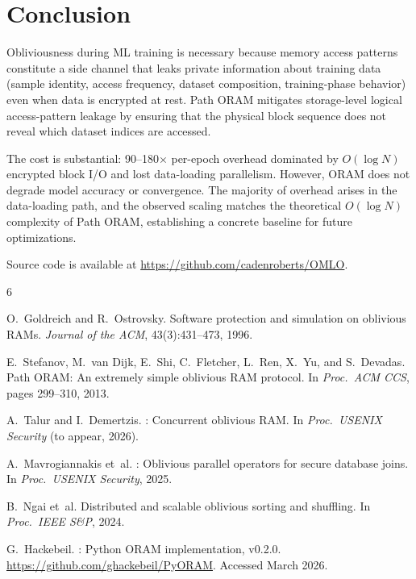 \documentclass[11pt]{article}
\begin{document}
\section{Conclusion}

Obliviousness during ML training is necessary because memory access patterns constitute a side channel that leaks private information about training data (sample identity, access frequency, dataset composition, training-phase behavior) even when data is encrypted at rest.
Path ORAM mitigates storage-level logical access-pattern leakage by ensuring that the physical block sequence does not reveal which dataset indices are accessed.

The cost is substantial: 90--180$\times$ per-epoch overhead dominated by $O(\log N)$ encrypted block I/O and lost data-loading parallelism.
However, ORAM does not degrade model accuracy or convergence.
The majority of overhead arises in the data-loading path, and the observed scaling matches the theoretical $O(\log N)$ complexity of Path ORAM, establishing a concrete baseline for future optimizations.

Source code is available at \url{https://github.com/cadenroberts/OMLO}.

\begin{thebibliography}{6}

O.~Goldreich and R.~Ostrovsky.
\newblock Software protection and simulation on oblivious {RAM}s.
\newblock \emph{Journal of the ACM}, 43(3):431--473, 1996.

E.~Stefanov, M.~van Dijk, E.~Shi, C.~Fletcher, L.~Ren, X.~Yu, and S.~Devadas.
\newblock Path {ORAM}: An extremely simple oblivious {RAM} protocol.
\newblock In \emph{Proc.\ ACM CCS}, pages 299--310, 2013.

A.~Talur and I.~Demertzis.
: Concurrent oblivious {RAM}.
\newblock In \emph{Proc.\ USENIX Security} (to appear, 2026).

A.~Mavrogiannakis et~al.
: Oblivious parallel operators for secure database joins.
\newblock In \emph{Proc.\ USENIX Security}, 2025.

B.~Ngai et~al.
\newblock Distributed and scalable oblivious sorting and shuffling.
\newblock In \emph{Proc.\ IEEE S\&P}, 2024.

G.~Hackebeil.
: Python {ORAM} implementation, v0.2.0.
\newblock \url{https://github.com/ghackebeil/PyORAM}. Accessed March 2026.

\end{thebibliography}
\end{document}
